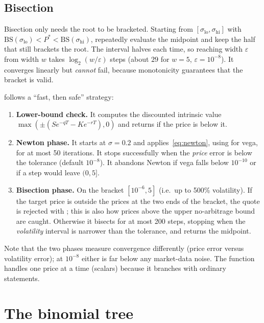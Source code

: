 \documentclass[11pt,a4paper]{article}
\newcommand{\fn}[1]{\texttt{\detokenize{#1}}}   %
\theoremstyle{plain}
\theoremstyle{remark}
\begin{document}
\subsection{Bisection}

Bisection only needs the root to be bracketed. Starting from $[\sigma_{\text{lo}},\sigma_{\text{hi}}]$ with
$\mathrm{BS}(\sigma_{\text{lo}})<P^\ast<\mathrm{BS}(\sigma_{\text{hi}})$, repeatedly evaluate the midpoint and keep the half that still
brackets the root. The interval halves each time, so reaching width $\varepsilon$ from width $w$ takes $\log_2(w/\varepsilon)$ steps
(about $29$ for $w=5$, $\varepsilon=10^{-8}$). It converges linearly but \emph{cannot} fail, because monotonicity guarantees
that the bracket is valid.

\begin{codenote}
\fn{implied_vol} follows a ``fast, then safe'' strategy:
\begin{enumerate}[nosep,leftmargin=*]
\item \textbf{Lower-bound check.} It computes the discounted intrinsic value
  $\max(\pm(Se^{-qT}-Ke^{-rT}),0)$ and returns \fn{NaN} if the price is below it.
\item \textbf{Newton phase.} It starts at $\sigma=0.2$ and applies~\eqref{eq:newton}, using
  \fn{bs_greeks} for vega, for at most 50 iterations. It stops successfully when the
  \emph{price} error is below the tolerance (default $10^{-8}$). It abandons Newton if vega falls
  below $10^{-10}$ or if a step would leave $(0,5]$.
\item \textbf{Bisection phase.} On the bracket $[10^{-6},5]$ (i.e.\ up to 500\% volatility). If the target price is
  outside the prices at the two ends of the bracket, the quote is rejected with \fn{NaN}; this is also how
  prices above the upper no-arbitrage bound are caught. Otherwise it bisects for at most 200 steps, stopping when the
  \emph{volatility} interval is narrower than the tolerance, and returns the midpoint.
\end{enumerate}
Note that the two phases measure convergence differently (price error versus volatility error); at
$10^{-8}$ either is far below any market-data noise. The function handles one price at a time (scalars) because it
branches with ordinary \fn{if} statements.
\end{codenote}

\section{The binomial tree}\label{sec:tree}
\end{document}

